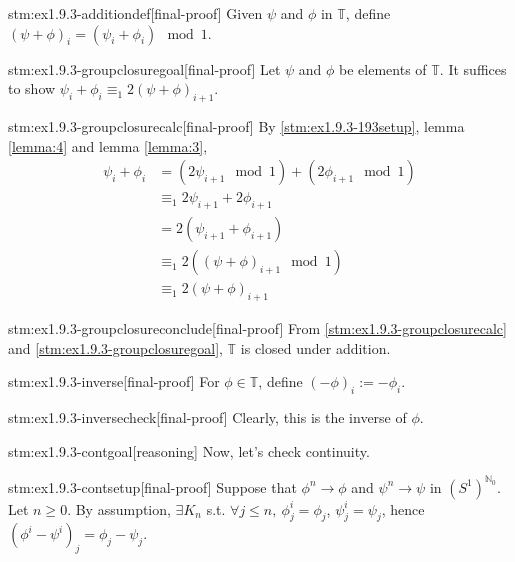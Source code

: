 \begin{stm}{stm:ex1.9.3-additiondef}[final-proof]
Given $\psi$ and $\phi$ in $\mathbb{T}$, define $(\psi + \phi)_i = (\psi_i + \phi_i) \mod 1$.
\end{stm}

\begin{stm}{stm:ex1.9.3-groupclosuregoal}[final-proof]
Let $\psi$ and $\phi$ be elements of $\mathbb{T}$. It suffices to show $\psi_i + \phi_i \equiv_1 2(\psi + \phi)_{i+1}$.
\end{stm}

\begin{stm}{stm:ex1.9.3-groupclosurecalc}[final-proof]
By \ref{stm:ex1.9.3-193setup}, lemma \ref{lemma:4} and lemma \ref{lemma:3},
\begin{align*}
\psi_i + \phi_i &= (2\psi_{i+1} \mod 1) + (2\phi_{i+1} \mod 1) \\
&\equiv_1 2\psi_{i+1} + 2\phi_{i+1} \\
&= 2(\psi_{i+1} + \phi_{i+1}) \\
&\equiv_1 2((\psi + \phi)_{i+1} \mod 1) \\
&\equiv_1 2(\psi + \phi)_{i+1}
\end{align*}
\end{stm}

\begin{stm}{stm:ex1.9.3-groupclosureconclude}[final-proof]
From \ref{stm:ex1.9.3-groupclosurecalc} and \ref{stm:ex1.9.3-groupclosuregoal}, $\mathbb{T}$ is closed under addition.
\end{stm}

\begin{stm}{stm:ex1.9.3-inverse}[final-proof]
For $\phi \in \mathbb{T}$, define $(-\phi)_i := -\phi_i$.
\end{stm}

\begin{stm}{stm:ex1.9.3-inversecheck}[final-proof]
Clearly, this is the inverse of $\phi$.
\end{stm}

\begin{stm}{stm:ex1.9.3-contgoal}[reasoning]
Now, let's check continuity.
\end{stm}

\begin{stm}{stm:ex1.9.3-contsetup}[final-proof]
Suppose that $\phi^n \to \phi$ and $\psi^n \to \psi$ in $(S^1)^{\mathbb{N}_0}$. Let $n \ge 0$. By assumption, $\exists K_n$ s.t. $\forall j \le n, \ \phi_j^i = \phi_j$, $\psi_j^i = \psi_j$, hence $(\phi^i - \psi^i)_j = \phi_j - \psi_j$.
\end{stm}

